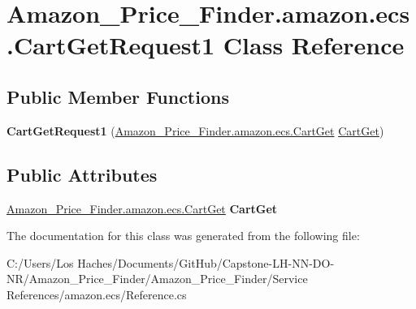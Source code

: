 \hypertarget{class_amazon___price___finder_1_1amazon_1_1ecs_1_1_cart_get_request1}{\section{Amazon\-\_\-\-Price\-\_\-\-Finder.\-amazon.\-ecs.\-Cart\-Get\-Request1 Class Reference}
\label{class_amazon___price___finder_1_1amazon_1_1ecs_1_1_cart_get_request1}
}
\subsection*{Public Member Functions}
\begin{DoxyCompactItemize}
\item 
\hypertarget{class_amazon___price___finder_1_1amazon_1_1ecs_1_1_cart_get_request1_ae86a96cded915b0a7394e7f035e24d39}{{\bfseries Cart\-Get\-Request1} (\hyperlink{class_amazon___price___finder_1_1amazon_1_1ecs_1_1_cart_get}{Amazon\-\_\-\-Price\-\_\-\-Finder.\-amazon.\-ecs.\-Cart\-Get} \hyperlink{class_amazon___price___finder_1_1amazon_1_1ecs_1_1_cart_get}{Cart\-Get})}\label{class_amazon___price___finder_1_1amazon_1_1ecs_1_1_cart_get_request1_ae86a96cded915b0a7394e7f035e24d39}

\end{DoxyCompactItemize}
\subsection*{Public Attributes}
\begin{DoxyCompactItemize}
\item 
\hypertarget{class_amazon___price___finder_1_1amazon_1_1ecs_1_1_cart_get_request1_add9335da25d91e4fcabd962ba209cbf5}{\hyperlink{class_amazon___price___finder_1_1amazon_1_1ecs_1_1_cart_get}{Amazon\-\_\-\-Price\-\_\-\-Finder.\-amazon.\-ecs.\-Cart\-Get} {\bfseries Cart\-Get}}\label{class_amazon___price___finder_1_1amazon_1_1ecs_1_1_cart_get_request1_add9335da25d91e4fcabd962ba209cbf5}

\end{DoxyCompactItemize}


The documentation for this class was generated from the following file\-:\begin{DoxyCompactItemize}
\item 
C\-:/\-Users/\-Los Haches/\-Documents/\-Git\-Hub/\-Capstone-\/\-L\-H-\/\-N\-N-\/\-D\-O-\/\-N\-R/\-Amazon\-\_\-\-Price\-\_\-\-Finder/\-Amazon\-\_\-\-Price\-\_\-\-Finder/\-Service References/amazon.\-ecs/Reference.\-cs\end{DoxyCompactItemize}
